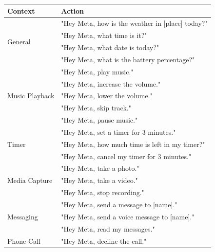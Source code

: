 \begin{table}[H]
    \centering
    \begin{tabular}{|l|l|}
        \hline
        \textbf{Context}                & \textbf{Action}                                      \\ \hline
        \multirow{4}{*}{General}        & "Hey Meta, how is the weather in [place] today?"     \\ \cline{2-2} 
                                        & "Hey Meta, what time is it?"                         \\ \cline{2-2} 
                                        & "Hey Meta, what date is today?"                      \\ \cline{2-2} 
                                        & "Hey Meta, what is the battery percentage?"          \\ \hline
        \multirow{5}{*}{Music Playback} & "Hey Meta, play music."                              \\ \cline{2-2} 
                                        & "Hey Meta, increase the volume."                     \\ \cline{2-2} 
                                        & "Hey Meta, lower the volume."                        \\ \cline{2-2}
                                        & "Hey Meta, skip track."                              \\ \cline{2-2}
                                        & "Hey Meta, pause music."                             \\ \hline
        \multirow{3}{*}{Timer}          & "Hey Meta, set a timer for 3 minutes."               \\ \cline{2-2} 
                                        & "Hey Meta, how much time is left in my timer?"       \\ \cline{2-2} 
                                        & "Hey Meta, cancel my timer for 3 minutes."           \\ \hline
        \multirow{3}{*}{Media Capture}  & "Hey Meta, take a photo."                            \\ \cline{2-2} 
                                        & "Hey Meta, take a video."                            \\ \cline{2-2} 
                                        & "Hey Meta, stop recording."                          \\ \hline
        \multirow{3}{*}{Messaging}      & "Hey Meta, send a message to [name]."                \\ \cline{2-2} 
                                        & "Hey Meta, send a voice message to [name]."          \\ \cline{2-2} 
                                        & "Hey Meta, read my messages."                        \\ \hline
        \multirow{1}{*}{Phone Call}     & "Hey Meta, decline the call."                        \\ \hline
                                        

\end{tabular}
\end{table}
